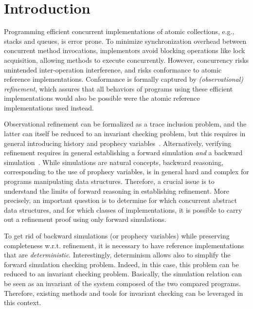 \vspace{-1mm}
\section{Introduction}

Programming efficient concurrent implementations of atomic collections, e.g., stacks and queues, is error prone. To minimize synchronization overhead between concurrent method invocations, implementors avoid blocking operations like lock acquisition, allowing methods to execute concurrently. However, concurrency risks unintended inter-operation interference, and risks conformance to atomic reference implementations. Conformance is formally captured by \emph{(observational) refinement}, which assures that all behaviors of programs
using these efficient implementations would also be possible were the atomic reference implementations used instead.

Observational refinement can be formalized as a trace inclusion problem, and the latter can itself be reduced to an invariant checking problem, but this requires in general introducing history and prophecy variables~\cite{DBLP:journals/tcs/AbadiL91}. Alternatively, verifying refinement requires in general establishing a forward simulation {\em and} a backward simulation~\cite{DBLP:journals/iandc/LynchV95}. While simulations are natural concepts, backward reasoning, corresponding to the use of prophecy variables, is in general hard and complex for programs manipulating data structures.
Therefore, a crucial issue is to understand the limits of forward reasoning in establishing refinement. More precisely, an important question is to determine for which concurrent abstract data structures, and for which classes of implementations, it is possible to carry out a refinement proof using only forward simulations.

To get rid of backward simulations (or prophecy variables) while preserving completeness w.r.t. refinement, it is necessary to have reference implementations 
that are {\em deterministic}. Interestingly, determinism allows also to simplify the forward simulation checking problem. Indeed, in this case, this problem can be reduced to an invariant checking problem. Basically, the simulation relation can be seen as an invariant of the system composed of the two compared programs. Therefore, existing methods and tools for invariant checking can be leveraged in this context. %

